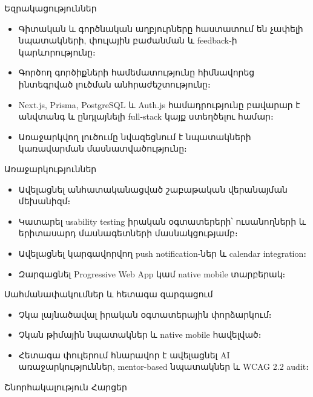 \documentclass[12pt,aspectratio=169]{beamer}
\begin{document}
\begin{frame}{Եզրակացություններ}
  \begin{itemize}
    \item Գիտական և գործնական աղբյուրները հաստատում են չափելի նպատակների, փուլային բաժանման և feedback-ի կարևորությունը։
    \item Գործող գործիքների համեմատությունը հիմնավորեց ինտեգրված լուծման անհրաժեշտությունը։
    \item Next.js, Prisma, PostgreSQL և Auth.js համադրությունը բավարար է անվտանգ և ընդլայնելի full-stack կայք ստեղծելու համար։
    \item Առաջարկվող լուծումը նվազեցնում է նպատակների կառավարման մասնատվածությունը։
  \end{itemize}
\end{frame}

\begin{frame}{Առաջարկություններ}
  \begin{itemize}
    \item Ավելացնել անհատականացված շաբաթական վերանայման մեխանիզմ։
    \item Կատարել usability testing իրական օգտատերերի՝ ուսանողների և երիտասարդ մասնագետների մասնակցությամբ։
    \item Ավելացնել կարգավորվող push notification-ներ և calendar integration։
    \item Զարգացնել Progressive Web App կամ native mobile տարբերակ։
  \end{itemize}
\end{frame}

\begin{frame}{Սահմանափակումներ և հետագա զարգացում}
  \begin{itemize}
    \item Չկա լայնածավալ իրական օգտատերային փորձարկում։
    \item Չկան թիմային նպատակներ և native mobile հավելված։
    \item Հետագա փուլերում հնարավոր է ավելացնել AI առաջարկություններ, mentor-based նպատակներ և WCAG 2.2 audit։
  \end{itemize}
\end{frame}

\begin{frame}{Շնորհակալություն}
  \centering
  \Large Հարցեր
\end{frame}
\end{document}
